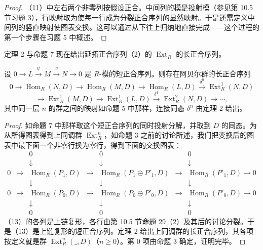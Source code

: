 \begin{proof}
（11）中左右两个非零列按假设正合。中间列的模是投射模（参见第 10.5 节习题 3），行映射取为使每一行成为分裂正合序列的显然映射。于是还需定义中间列的竖直映射使图表交换。这可以通过从下往上归纳地直接完成——这个过程的第一个步骤在习题 5 中概述。
\end{proof}

定理 2 与命题 7 现在给出延拓正合序列（2）的 \(\operatorname{Ext}_R\) 的长正合序列。

\begin{theorem}\label{thm:17.8}
设 \(0 \to L \xrightarrow{\psi} M \xrightarrow{\varphi} N \to 0\) 是 \(R\)-模的短正合序列。则存在阿贝尔群的长正合序列
\[
0 \to \operatorname{Hom}_R(N, D) \to \operatorname{Hom}_R(M, D) \to \operatorname{Hom}_R(L, D) \xrightarrow{\delta^0} \operatorname{Ext}_R^1(N, D) \tag{17.12}
\]
\[
\to \operatorname{Ext}_R^1(M, D) \to \operatorname{Ext}_R^1(L, D) \xrightarrow{\delta^1} \operatorname{Ext}_R^2(N, D) \to \cdots,
\]
其中同一层 \(n\) 的群之间的映射如命题 5 中那样，连接同态 \(\delta^n\) 由定理 2 给出。
\end{theorem}

\begin{proof}
如命题 7 中那样取这个短正合序列的同时投射分解，并取到 \(D\) 的同态。为从所得图表得到上同调群 \(\operatorname{Ext}_R^n\)，如命题 3 之前的讨论所述，我们把变换后的图表中最下面一个非零行换为零行，得到下面的交换图表：
\[
\begin{array}{ccccccc}
& & 0 & & 0 & & 0\\
& & \downarrow & & \downarrow & & \downarrow\\
0 & \to & \operatorname{Hom}_R(P_1, D) & \to & \operatorname{Hom}_R(P_1 \oplus P'_1, D) & \to & \operatorname{Hom}_R(P'_1, D) \to 0\\
& & \downarrow & & \downarrow & & \downarrow\\
0 & \to & \operatorname{Hom}_R(P_0, D) & \to & \operatorname{Hom}_R(P_0 \oplus P'_0, D) & \to & \operatorname{Hom}_R(P'_0, D) \to 0\\
& & \downarrow & & \downarrow & & \downarrow\\
& & 0 & & 0 & & 0
\end{array} \tag{17.13}
\]
（13）的各列是上链复形，各行由第 10.5 节命题 29（2）及其后的讨论分裂。于是（13）是上链复形的短正合序列。定理 2 给出上同调群的长正合序列，其各项按定义就是群 \(\operatorname{Ext}_R^n(\_, D)\)（\(n \geq 0\)）。第 0 项由命题 3 确定，证明完毕。
\end{proof}

